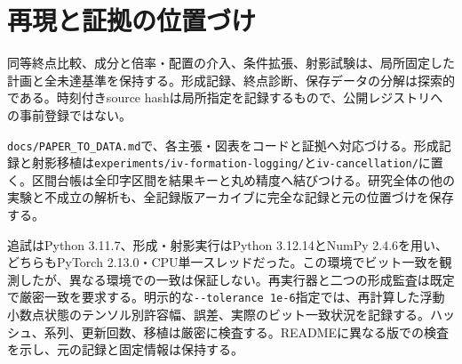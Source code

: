 \section{再現と証拠の位置づけ}
\label{app:status}
同等終点比較、成分と倍率・配置の介入、条件拡張、射影試験は、局所固定した計画と全未達基準を保持する。形成記録、終点診断、保存データの分解は探索的である。時刻付きsource hashは局所指定を記録するもので、公開レジストリへの事前登録ではない。

\texttt{docs/PAPER\_TO\_DATA.md}で、各主張・図表をコードと証拠へ対応づける。形成記録と射影移植は\texttt{experiments/iv-formation-logging/}と\texttt{iv-cancellation/}に置く。区間台帳は全印字区間を結果キーと丸め精度へ結びつける。研究全体の他の実験と不成立の解析も、全記録版アーカイブに完全な記録と元の位置づけを保存する。

追試はPython 3.11.7、形成・射影実行はPython 3.12.14とNumPy 2.4.6を用い、どちらもPyTorch 2.13.0・CPU単一スレッドだった。この環境でビット一致を観測したが、異なる環境での一致は保証しない。再実行器と二つの形成監査は既定で厳密一致を要求する。明示的な\texttt{-{}-tolerance 1e-6}指定では、再計算した浮動小数点状態のテンソル別許容幅、誤差、実際のビット一致状況を記録する。ハッシュ、系列、更新回数、移植は厳密に検査する。READMEに異なる版での検査を示し、元の記録と固定情報は保持する。

